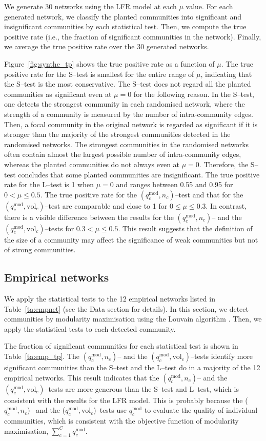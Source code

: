 \documentclass[fleqn,10pt]{wlscirep}
\def\qmod{q^{\text{mod}}}
\def\vol{\text{vol}}
\begin{document}
We generate 30 networks using the LFR model at each $\mu$ value.  
For each generated network, we classify the planted communities into significant and insignificant communities by each statistical test. 
Then, we compute the true positive rate (i.e., the fraction of significant communities in the network). 
Finally, we average the true positive rate over the 30 generated networks. 

Figure~\ref{fig:synthe_tp} shows the true positive rate as a function of $\mu$.
The true positive rate for the S--test is smallest for the entire range of $\mu$, indicating that the S--test is the most conservative.
The S--test does not regard all the planted communities as significant even at $\mu=0$ for the following reason.
In the S--test, one detects the strongest community in each randomised network, where the strength of a community is measured by the number of intra-community edges. 
Then, a focal community in the original network is regarded as significant if it is stronger than the majority of the strongest communities detected in the randomised networks.
The strongest communities in the randomised networks often contain almost the largest possible number of intra-community edges, whereas the planted communities do not always even at $\mu = 0$. 
Therefore, the S--test concludes that some planted communities are insignificant.
The true positive rate for the L--test is 1 when $\mu =0$ and ranges between 0.55 and 0.95 for $0 < \mu \leq 0.5$.
The true positive rate for the $(\qmod_c, n_c)$--test and that for the $(\qmod_c, \vol_c)$--test are comparable and close to 1 for $0\leq \mu \leq 0.3$.
In contrast, there is a visible difference between the results for the $(\qmod_c, n_c)$-- and the $(\qmod_c, \vol_c)$--tests for $0.3 < \mu \leq 0.5$. 
This result suggests that the definition of the size of a community may affect the significance of weak communities but not of strong communities.

\subsection{Empirical networks}
\label{sec:empirical_networks}
We apply the statistical tests to the 12 empirical networks listed in Table~\ref{ta:empnet} (see the Data section for details).
In this section, we detect communities by modularity maximisation using the Louvain algorithm \cite{Blondel2008}.
Then, we apply the statistical tests to each detected community.

The fraction of significant communities for each statistical test is shown in Table~\ref{ta:emp_tp}. 
The $(\qmod_c, n_c)$-- and the $(\qmod_c, \vol_c)$--tests identify more significant communities than the S--test and the L--test do in a majority of the 12 empirical networks.
This result indicates that the $(\qmod_c, n_c)$-- and the $(\qmod_c, \vol_c)$--tests are more generous than the S--test and L--test, which is consistent with the results for the LFR model.
This is probably because the ($\qmod_c, n_c$)-- and the ($\qmod_c, \vol_c$)--tests use $\qmod_c$ to evaluate the quality of individual communities, which is consistent with the objective function of modularity maximisation, $\sum_{c=1}^C \qmod_c$.
\end{document}

